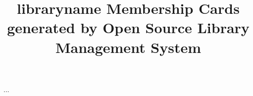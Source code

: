 \documentclass[twocolumn,a4paper]{report}
\title{libraryname Membership Cards\\\small{generated by Open Source Library Management System}}
\author{}
\begin{document}
    \maketitle
    ...
\end{document}
